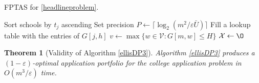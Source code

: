 \documentclass[11pt]{article} %
\newtheorem{theorem}{Theorem}
\theoremstyle{definition}
\begin{document}
\begin{algorithm}[h] 
\caption{FPTAS for \eqref{headlineproblem}.} \label{ellisDP3}
Sort schools by $t_j$ ascending\;
Set precision $P \gets \bigl\lceil\log_{2}\left(m^2 / \varepsilon \bar U\right)\bigr\rceil$\;
Fill a lookup table with the entries of $G[j, h]$\; \label{createdlookuptable}
$v\gets  \max\{ w \in \mathcal{V} : G[m, w] \leq H\}$\; \label{vrecordedhere}
$\mathcal{X} \gets \O$\;
\;
\end{algorithm}

\begin{theorem}[Validity of Algorithm \ref{ellisDP3}] \label{validityoffptas}
Algorithm \ref{ellisDP3} produces a $(1 - \varepsilon)$-optimal application portfolio for the college application problem in $O(m^3 /\varepsilon)$ time. %
\end{theorem}
\end{document}
